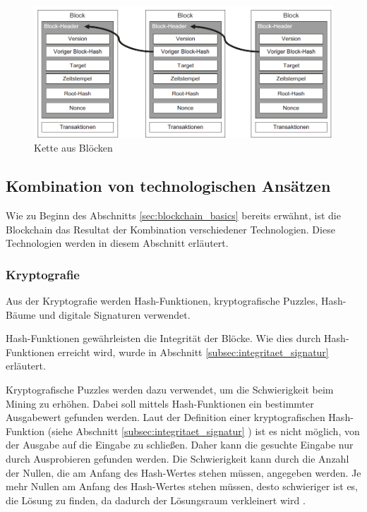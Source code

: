 \begin{figure}[H]
    \centering
    \includegraphics[width=0.9\linewidth]{images/chain_of_blocks.png}
    \caption{Kette aus Blöcken \parencite[S. 12]{Fill_BlockchainGrundlagen}}
    \label{fig:chain_of_blocks}
\end{figure}


\subsection{Kombination von technologischen Ansätzen}
\label{subsec:cryptography_basics}

Wie zu Beginn des Abschnitts \ref{sec:blockchain_basics} \textit{} bereits erwähnt, ist die Blockchain das Resultat der Kombination verschiedener Technologien. Diese Technologien werden in diesem Abschnitt erläutert.


\subsubsection{Kryptografie}

Aus der Kryptografie werden Hash-Funktionen, kryptografische Puzzles, Hash-Bäume und digitale Signaturen verwendet. 

Hash-Funktionen gewährleisten die Integrität der Blöcke. Wie dies durch Hash-Funktionen erreicht wird, wurde in Abschnitt \ref{subsec:integritaet_signatur} \textit{} erläutert. 

Kryptografische Puzzles werden dazu verwendet, um die Schwierigkeit beim Mining zu erhöhen. Dabei soll mittels Hash-Funktionen ein bestimmter Ausgabewert gefunden werden. Laut der Definition einer kryptografischen Hash-Funktion (siehe Abschnitt \ref{subsec:integritaet_signatur} \textit{}) ist es nicht möglich, von der Ausgabe auf die Eingabe zu schließen. Daher kann die gesuchte Eingabe nur durch Ausprobieren gefunden werden. Die Schwierigkeit kann durch die Anzahl der Nullen, die am Anfang des Hash-Wertes stehen müssen, angegeben werden. Je mehr Nullen am Anfang des Hash-Wertes stehen müssen, desto schwieriger ist es, die Lösung zu finden, da dadurch der Lösungsraum verkleinert wird \parencites[S. 6-7]{Fill_BlockchainGrundlagen}[S. 320]{Antonopoulos_MasteringEthereum}.

